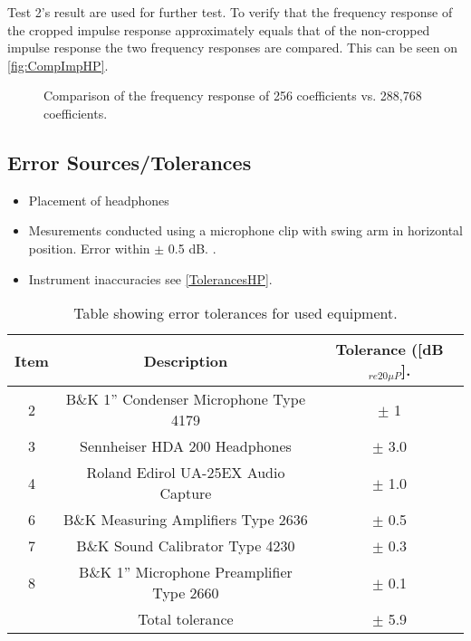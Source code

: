 Test 2's result are used for further test. To verify that the frequency response of the cropped impulse response approximately equals that of the non-cropped impulse response the two frequency responses are compared. This can be seen on \autoref{fig:CompImpHP}.

\begin{figure}[H]
	\centering
	
	\caption{Comparison of the frequency response of 256 coefficients vs. 288,768 coefficients.}
	\label{fig:CompImpHP}
\end{figure}



\subsection{Error Sources/Tolerances}
\begin{itemize}
	\item Placement of headphones %
	 \item Mesurements conducted using a microphone clip with swing arm in horizontal position. Error within $\pm$ 0.5 dB. \citep{BK1985}. 
	\item Instrument inaccuracies see \autoref{TolerancesHP}.
\end{itemize}

\begin{table}[H]
	\centering
	\begin{tabular}{ c c c } \toprule
	{Item}	& 		{Description} 							& {Tolerance ([dB$_{re20\mu P}$]}.\\ \bottomrule 
		2	&	B\&K 1'' Condenser Microphone Type 4179 	& $\pm$ 1		\\
		3	&	Sennheiser HDA 200 Headphones				& $\pm$ 3.0		\\
		4	&	Roland Edirol UA-25EX Audio Capture			& $\pm$ 1.0		\\
		6	&	B\&K Measuring Amplifiers Type 2636			& $\pm$ 0.5		\\
		7	&	B\&K Sound Calibrator Type 4230				& $\pm$ 0.3		\\ 
		8	&	B\&K 1'' Microphone Preamplifier Type 2660	& $\pm$ 0.1		\\ \bottomrule
			&	Total tolerance								& $\pm$ 5.9		\\ \bottomrule	
	\end{tabular}
	\caption{Table showing error tolerances for used equipment.}
	\label{TolerancesHP}
\end{table}


